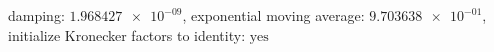 damping: $\num[scientific-notation=true]{1.968427e-09}$, exponential moving average: $\num[scientific-notation=true]{9.703638e-01}$, initialize Kronecker factors to identity: $\text{yes}$